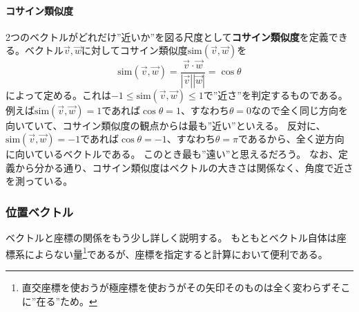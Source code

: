 \documentclass[10pt]{jsarticle}
\theoremstyle{definition}%
\newcommand{\vc}[1]{\overrightarrow{#1}}%
\numberwithin{equation}{section}%
\begin{document}
\paragraph{コサイン類似度}
2つのベクトルがどれだけ''近いか''を図る尺度として{\bf コサイン類似度}を定義できる。ベクトル$\vc{v},\vc{w}$に対してコサイン類似度$\mathrm{sim}(\vc{v},\vc{w})$を
\begin{equation}
\label{cossim} \mathrm{sim}(\vc{v},\vc{w})=\frac{\vc{v}\cdot \vc{w}}{|\vc{v}||\vc{w}|}=\cos{\theta}
\end{equation}
によって定める。これは$-1\leq \mathrm{sim}(\vc{v},\vc{w})\leq 1$で''近さ''を判定するものである。例えば$\mathrm{sim}(\vc{v},\vc{w})=1$であれば$\cos{\theta}=1$、すなわち$\theta=0$なので全く同じ方向を向いていて、コサイン類似度の観点からは最も''近い''といえる。
反対に、$\mathrm{sim}(\vc{v},\vc{w})=-1$であれば$\cos{\theta}=-1$、すなわち$\theta=\pi$であるから、全く逆方向に向いているベクトルである。
このとき最も''遠い''と思えるだろう。
なお、定義から分かる通り、コサイン類似度はベクトルの大きさは関係なく、角度で近さを測っている。
\subsubsection{位置ベクトル}
ベクトルと座標の関係をもう少し詳しく説明する。
もともとベクトル自体は座標系によらない量\footnote{直交座標を使おうが極座標を使おうがその矢印そのものは全く変わらずそこに''在る''ため。}であるが、座標を指定すると計算において便利である。
\end{document}
